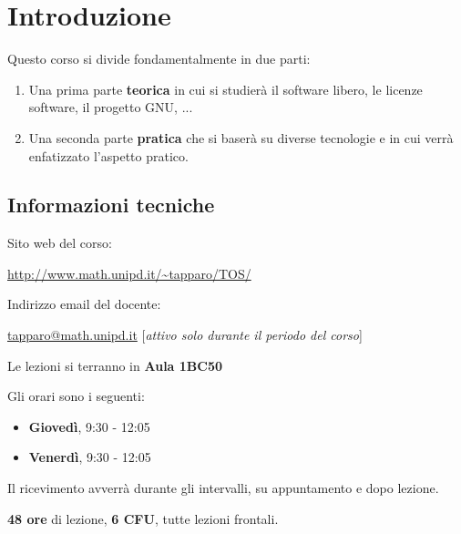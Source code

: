 \section{Introduzione}

Questo corso si divide fondamentalmente in due parti:

\begin{enumerate}

	\item Una prima parte \textbf{teorica} in cui si studierà il software libero, le licenze software, il progetto GNU, ...
	\item Una seconda parte \textbf{pratica} che si baserà su diverse tecnologie e in cui verrà enfatizzato l'aspetto pratico.

\end{enumerate}

\subsection{Informazioni tecniche}

Sito web del corso:

\begin{center}

\url{http://www.math.unipd.it/~tapparo/TOS/}

\end{center}

Indirizzo email del docente:

\begin{center}

\url{tapparo@math.unipd.it} [\textit{attivo solo durante il periodo del corso}]

\end{center}

Le lezioni si terranno in \textbf{Aula 1BC50}

Gli orari sono i seguenti:

\begin{itemize}

\item \textbf{Giovedì}, 9:30 - 12:05
\item \textbf{Venerdì}, 9:30 - 12:05

\end{itemize}

Il ricevimento avverrà durante gli intervalli, su appuntamento e dopo lezione.

\textbf{48 ore} di lezione, \textbf{6 CFU}, tutte lezioni frontali.

